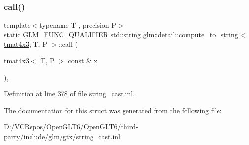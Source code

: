 \subsubsection{\texorpdfstring{call()}{call()}}
{\footnotesize\ttfamily template$<$typename T , precision P$>$ \\
static \mbox{\hyperlink{setup_8hpp_a33fdea6f91c5f834105f7415e2a64407}{G\+L\+M\+\_\+\+F\+U\+N\+C\+\_\+\+Q\+U\+A\+L\+I\+F\+I\+ER}} \mbox{\hyperlink{glad_8h_ac83513893df92266f79a515488701770}{std\+::string}} \mbox{\hyperlink{structglm_1_1detail_1_1compute__to__string}{glm\+::detail\+::compute\+\_\+to\+\_\+string}}$<$ \mbox{\hyperlink{structglm_1_1tmat4x3}{tmat4x3}}, T, P $>$\+::call (\begin{DoxyParamCaption}\item[{\mbox{\hyperlink{structglm_1_1tmat4x3}{tmat4x3}}$<$ T, P $>$ const \&}]{x }\end{DoxyParamCaption})\hspace{0.3cm}{\ttfamily [inline]}, {\ttfamily [static]}}



Definition at line 378 of file string\+\_\+cast.\+inl.



The documentation for this struct was generated from the following file\+:\begin{DoxyCompactItemize}
\item 
D\+:/\+V\+C\+Repos/\+Open\+G\+L\+T6/\+Open\+G\+L\+T6/third-\/party/include/glm/gtx/\mbox{\hyperlink{string__cast_8inl}{string\+\_\+cast.\+inl}}\end{DoxyCompactItemize}
